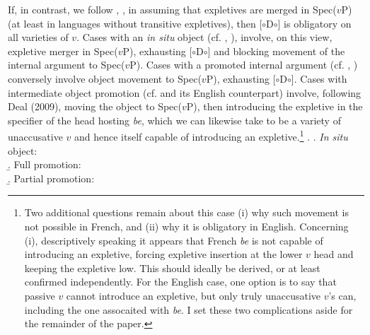\documentclass[11pt, letterpaper]{paper_nick}
\newcommand{\fm}[1]{[$\circ$#1$\circ$]}
\begin{document}
If, in contrast, we follow \citet{richards06}, \citet{deal09}, \citet{wu18} in assuming that expletives are merged in Spec($v$P) (at least in languages without transitive expletives), then \fm{D} is obligatory on all varieties of $v$. Cases with an \emph{in situ} object (cf. \LLast[a], \Last[a]), involve, on this view, expletive merger in Spec($v$P), exhausting \fm{D} and blocking movement of the internal argument to Spec($v$P). Cases with a promoted internal argument (cf. \LLast[b], \Last[b]) conversely involve object movement to Spec($v$P), exhausting \fm{D}. Cases with intermediate object promotion (cf. \LLast[b] and its English counterpart) involve, following Deal (2009), moving the object to Spec($v$P), then introducing the expletive in the specifier of the head hosting \emph{be}, which we can likewise take to be a variety of unaccusative $v$ and hence itself capable of introducing an expletive.\footnote{Two additional questions remain about this case (i) why such movement is not possible in French, and (ii) why it is obligatory in English. Concerning (i), descriptively speaking it appears that French \emph{be} is not capable of introducing an expletive, forcing expletive insertion at the lower $v$ head and keeping the expletive low. This should ideally be derived, or at least confirmed independently. For the English case, one option is to say that passive $v$ cannot introduce an expletive, but only truly unaccusative $v$'s can, including the one assocaited with \emph{be}. I set these two complications aside for the remainder of the paper.} 
\ex. \a. \emph{In situ} object:\\
\b. Full promotion:\\
\b. Partial promotion:\\
\end{document}
